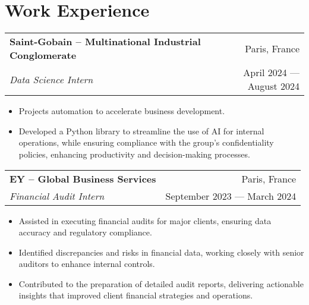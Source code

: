 \documentclass[a4paper,9pt]{extarticle}
\begin{document}
\section*{\faBriefcase \hspace{0.1em} Work Experience}

\begin{tabularx}{\textwidth}{@{}Xr@{}}
\textbf{Saint-Gobain -- Multinational Industrial Conglomerate} & Paris, France\\
\textit{Data Science Intern} & April 2024 — August 2024\\
\end{tabularx}
\vspace{-5pt}
\begin{itemize} \itemsep -1pt
    \item Projects automation to accelerate business development.
    \item Developed a Python library to streamline the use of AI for internal operations, while ensuring compliance with the group’s confidentiality policies, enhancing productivity and decision-making processes.
\end{itemize}

\vspace{5pt}
\noindent
\begin{tabularx}{\textwidth}{@{}Xr@{}}
\textbf{EY -- Global Business Services} & Paris, France\\
\textit{Financial Audit Intern} & September 2023 — March 2024\\
\end{tabularx}
\vspace{-5pt}
\begin{itemize} \itemsep -1pt
    \item Assisted in executing financial audits for major clients, ensuring data accuracy and regulatory compliance.
    \item Identified discrepancies and risks in financial data, working closely with senior auditors to enhance internal controls.
    \item Contributed to the preparation of detailed audit reports, delivering actionable insights that improved client financial strategies and operations.
\end{itemize}

\vspace{6pt}

\end{document}
